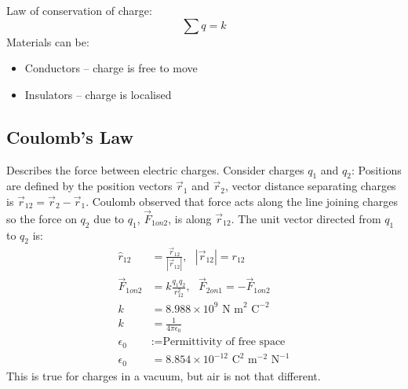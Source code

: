 \documentclass[a4paper, 11pt, normalem]{report}
\begin{document}
Law of conservation of charge:
\begin{equation}
    \sum q = k
\end{equation}
Materials can be:
\begin{itemize}
    \item Conductors -- charge is free to move
    \item Insulators -- charge is localised
\end{itemize}

\section{Coulomb's Law}
Describes the force between electric charges.
Consider charges $q_{1}$ and $q_{2}$:
Positions are defined by the position vectors $\vec{r}_{1}$ and $\vec{r}_{2}$, vector distance separating charges is $\vec{r}_{12} = \vec{r}_{2} - \vec{r}_{1}$.
Coulomb observed that force acts along the line joining charges so the force on $q_{2}$ due to $q_{1}$, $\vec{F}_{1on2}$, is along $\vec{r}_{12}$.
The unit vector directed from $q_{1}$ to $q_{2}$ is:
\begin{align}
    \hat{r}_{12} &= \frac{\vec{r}_{12}}{|\vec{r}_{12}|},~~~|\vec{r}_{12}| = r_{12} \\
    \vec{F}_{1on2} &= k\frac{q_{1}q_{2}}{r_{12}^{2}},~~~\vec{F}_{2on1} = -\vec{F}_{1on2} \\
    k &= 8.988\times10^9\text{ N m}^{2}\text{ C}^{-2} \\
    k &= \frac{1}{4\pi\epsilon_{0}} \\
    \epsilon_{0} &:= \text{Permittivity of free space} \\
    \epsilon_{0} &= 8.854\times10^{-12}\text{ C}^{2}\text{ m}^{-2}\text{ N}^{-1}
\end{align}
This is true for charges in a vacuum, but air is not that different.

\chapter{}
\end{document}
